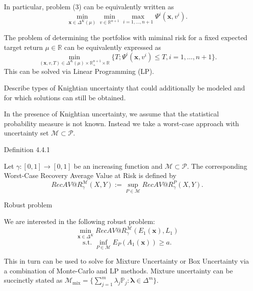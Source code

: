 In particular, problem (3) can be equivalently written as
\[\min_{\mathbf{x} \in \Delta^K(\mu)} \min_{v \in \mathbb{R}^{n+1}} \max_{i=1, \dots, n+1} \Psi^i(\mathbf{x}, v^i).\]

The problem of determining the portfolios with miminal risk for a fixed expected target return \(\mu \in \mathbb{R}\) can be equivalently expressed as
\[\min_{(\mathbf{x}, v, T) \in \Delta^K(\mu) \times \mathbb{R}_+^{n+1} \times \mathbb{R}} \{ T; \Psi^i(\mathbf{x}, v^i) \leq T, i = 1, \dots, n+1 \}.\]
This can be solved via Linear Programming (LP).


Describe types of Knightian uncertainty that could additionally be modeled and
for which solutions can still be obtained.

In the presence of Knightian uncertainty, we assume that the statistical probability measure is not known. Instead we take a worst-case approach with uncertainty set \(\mathcal{M} \subset \mathcal{P}\).

Definition 4.4.1

Let \(\gamma: [0,1] \rightarrow [0,1]\) be an increasing function and \(\mathcal{M} \subset \mathcal{P}\). 
The corresponding Worst-Case Recovery Average Value at Risk is defined by
\[RecAV@R_{\gamma}^{\mathcal{M}}(X, Y) := \sup_{P \in \mathcal{M}} RecAV@R_{\gamma}^P(X, Y).\]

Robust problem

We are interested in the following robust problem:
\[\min_{\mathbf{x} \in \Delta^K} RecAV@R_{\gamma}^{\mathcal{M}}(E_1(\mathbf{x}), L_1)\]
\[\text{s.t. } \inf_{P \in \mathcal{M}} E_P(A_1(\mathbf{x})) \geq a.\]

This in turn can be used to solve for Mixture Uncertainty or Box Uncertainty via a combination of Monte-Carlo and LP methods.
Mixture uncertainty can be succinctly stated as 
\(\mathcal{M}_{\text{mix}} = \{ \sum_{j=1}^m \lambda_j \mathbb{P}_j : \mathbf{\lambda} \in \Delta^m \}\).


